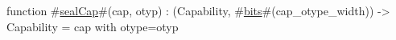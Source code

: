 function #\hyperref[sailRISCVzsealCap]{sealCap}#(cap, otyp) : (Capability, #\hyperref[sailRISCVzbits]{bits}#(cap_otype_width)) -> Capability =
    {cap with otype=otyp}
